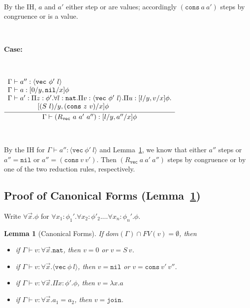 \documentclass[copyright]{eptcs}
\newtheorem{lemma}{Lemma}
\newcommand{\vc}[0]{\texttt{vec}}
\newcommand{\nat}[0]{\texttt{nat}}
\newcommand{\nil}[0]{\texttt{nil}}
\newcommand{\cons}[0]{\texttt{cons}}
\newcommand{\join}[0]{\texttt{join}}
\begin{document}
\ 

\noindent By the IH, $a$ and $a'$ either step or are values; accordingly $(\cons\ a\ a')$ steps by congruence or is a value.

\ 

\noindent \textbf{Case:}

\

$\infer{\Gamma\vdash (R_\vc\ a\ a'\ a''):[l/y, a''/x]\phi}
      {\begin{array}{l}\Gamma \vdash a'' : \langle \vc\ \phi'\ l\rangle \\
       \Gamma \vdash a : [0/y,\nil/x]\phi \\
       \Gamma \vdash a' : \Pi z:\phi'. \forall l:\nat. \Pi v :\langle \vc\ \phi'\ l\rangle. \Pi u : [l/y, v/x]\phi. \\
        \ \ \ \ \ \ \ \ \ \ \ \ \  [(S\ l)/y, (\cons\ z\ v)/x]\phi
       \end{array}}$

\ 

\noindent By the IH for $\Gamma \vdash a'' : \langle \vc\ \phi'\ l\rangle$ and Lemma~\ref{lem:canonical}, we know that either $a''$ steps or $a'' = \nil$ or $a'' = (\cons\ v\ v')$. Then $(R_\vc\ a\ a'\ a'')$ steps by congruence or by one of the two reduction rules, respectively.


\subsection{Proof of Canonical Forms (Lemma~\ref{lem:canonical})}
\label{sec:canonical}

Write $\forall \vec{x}.\phi$ for $\forall x_1:\phi_1'. \forall x_2:\phi'_2. \dots \forall x_n:\phi_n'.\phi$.
\begin{lemma}[Canonical Forms]
\label{lem:canonical}
If $\textit{dom}(\Gamma)\cap FV(v) = \emptyset$, then
\begin{itemize}
\item if $\Gamma \vdash v : \forall \vec{x}. \nat$, then $v = 0$ or $v = S\ v$.
\item if $\Gamma \vdash v : \forall \vec{x}. \langle\vc\ \phi\ l\rangle$, then $v = \nil$ or $v = \cons\ v'\ v''$.
\item if $\Gamma \vdash v : \forall \vec{x}. \Pi x:\phi'.\phi$, then $v = \lambda x.a$
\item if $\Gamma \vdash v : \forall \vec{x}. a_1 = a_2$, then $v = \join$.
\end{itemize}
\end{lemma}
\end{document}
